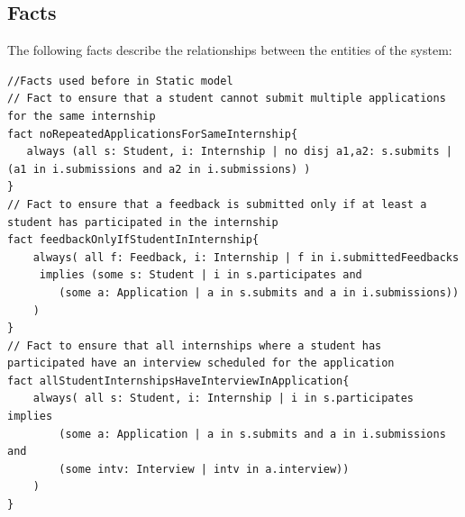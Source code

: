\subsection{Facts}
The following facts describe the relationships between the entities of the system:
\begin{lstlisting}
//Facts used before in Static model 
// Fact to ensure that a student cannot submit multiple applications for the same internship
fact noRepeatedApplicationsForSameInternship{
   always (all s: Student, i: Internship | no disj a1,a2: s.submits | (a1 in i.submissions and a2 in i.submissions) )
}
// Fact to ensure that a feedback is submitted only if at least a student has participated in the internship
fact feedbackOnlyIfStudentInInternship{
    always( all f: Feedback, i: Internship | f in i.submittedFeedbacks 
     implies (some s: Student | i in s.participates and 
        (some a: Application | a in s.submits and a in i.submissions))
    )
}
// Fact to ensure that all internships where a student has participated have an interview scheduled for the application
fact allStudentInternshipsHaveInterviewInApplication{
    always( all s: Student, i: Internship | i in s.participates implies 
        (some a: Application | a in s.submits and a in i.submissions and
        (some intv: Interview | intv in a.interview))
    )
}


\end{lstlisting}
